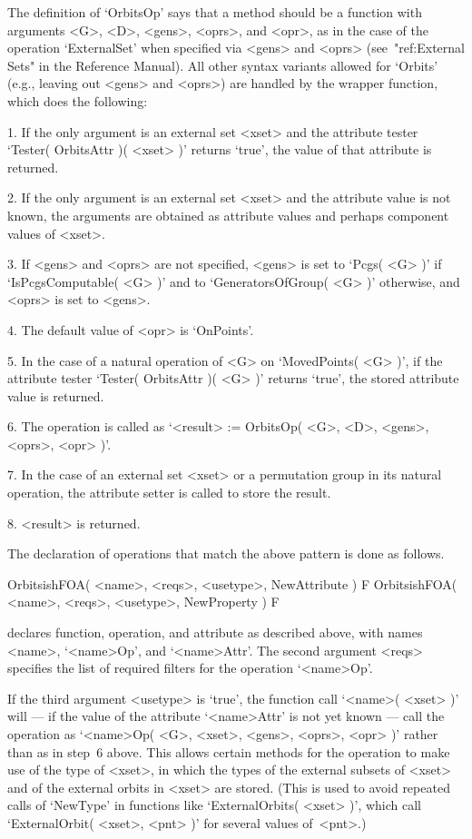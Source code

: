 The definition of `OrbitsOp' says that a method should be a function
with arguments <G>, <D>, <gens>, <oprs>, and <opr>,
as in the case of the operation `ExternalSet' when specified via <gens>
and <oprs> (see~"ref:External Sets" in the Reference Manual).
All other syntax variants allowed for `Orbits' (e.g., leaving
out <gens> and <oprs>) are handled by the wrapper function,
which does the following:
\beginlist
  \item{1.}
    If the only  argument  is an  external  set <xset> and the  attribute
    tester `Tester( OrbitsAttr )( <xset> )' returns  `true', the value of
    that attribute is returned.
  \item{2.}
    If the  only argument is   an external set  <xset> and  the attribute
    value is not known,
    the arguments are obtained as attribute values and perhaps component
    values of <xset>.
  \item{3.}
    If <gens> and <oprs> are not specified,
    <gens> is set to `Pcgs( <G> )' if `IsPcgsComputable( <G> )'
    and to `GeneratorsOfGroup( <G> )' otherwise,
    and <oprs> is set to <gens>.
  \item{4.}
    The default value of <opr> is `OnPoints'.
  \item{5.}
    In the case of a natural operation of <G> on `MovedPoints( <G> )', if
    the  attribute tester `Tester( OrbitsAttr )(   <G> )' returns `true',
    the stored attribute value is returned.
  \item{6.}
    The  operation is called as `<result>  := OrbitsOp( <G>, <D>, <gens>,
    <oprs>, <opr> )'.
  \item{7.}
    In the case of an external set <xset> or a permutation group in its
    natural operation, the attribute setter is called to store the result.
  \item{8.}
    <result> is returned.
\endlist

The declaration of operations that match the above pattern is done
as follows.

\>OrbitsishFOA( <name>, <reqs>, <usetype>, NewAttribute ) F
\>OrbitsishFOA( <name>, <reqs>, <usetype>, NewProperty ) F

declares function, operation, and attribute as described above,
with names <name>, `<name>Op', and `<name>Attr'.
The second argument <reqs> specifies the list of required filters for the
operation `<name>Op'.

If the third  argument <usetype> is `true',
the function  call `<name>( <xset> )' will
--- if the value of the attribute `<name>Attr' is  not yet known ---
call the operation as `<name>Op( <G>, <xset>, <gens>, <oprs>, <opr> )'
rather than as in step~6 above.
This allows certain methods for the operation to make use of the type of
<xset>, in which the types of the external subsets of
<xset> and of the external orbits in <xset> are stored.
(This is used to avoid repeated calls of `NewType' in functions like
`ExternalOrbits( <xset> )',
which call `ExternalOrbit( <xset>, <pnt> )' for several values of~<pnt>.)

